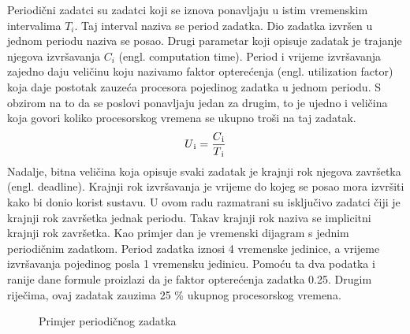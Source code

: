 \documentclass[../zavrsni.tex]{subfiles}
\begin{document}
Periodični zadatci su zadatci koji se iznova ponavljaju u istim vremenskim intervalima $T_i$. Taj interval naziva se period zadatka.
Dio zadatka izvršen u jednom periodu naziva se posao.
Drugi parametar koji opisuje zadatak je trajanje njegova izvršavanja $C_i$ (engl. computation time). Period i vrijeme izvršavanja zajedno daju veličinu 
koju nazivamo faktor opterećenja (engl. utilization factor) koja daje postotak zauzeća procesora pojedinog zadatka u jednom periodu. S obzirom na to da se poslovi
ponavljaju jedan za drugim, to je ujedno i veličina koja govori koliko procesorskog vremena se ukupno troši na taj zadatak.
\begin{equation*}
    U\textsubscript{i} = \frac{C\textsubscript{i}}{T\textsubscript{i}}
\end{equation*}
Nadalje, bitna veličina koja opisuje svaki zadatak je krajnji rok njegova završetka (engl. deadline). Krajnji rok izvršavanja je vrijeme 
do kojeg se posao mora izvršiti kako bi donio korist sustavu. U ovom radu razmatrani su 
isključivo zadatci čiji je krajnji rok završetka jednak periodu. Takav krajnji rok naziva se implicitni krajnji rok završetka. 
Kao primjer dan je vremenski dijagram s jednim periodičnim zadatkom.
Period zadatka iznosi 4 vremenske jedinice, a vrijeme izvršavanja pojedinog posla 1 vremensku jedinicu. Pomoću ta dva podatka i ranije 
dane formule proizlazi da je faktor opterećenja zadatka 0.25. Drugim riječima, ovaj zadatak zauzima 25 \% ukupnog procesorskog vremena.

\begin{figure}[h]
    \centering

    \begin{RTGrid}[width=13cm]{1}{8}

  

    \end{RTGrid}

    \caption{Primjer periodičnog zadatka}
    \label{fig:ex1}
  \end{figure}
\end{document}
